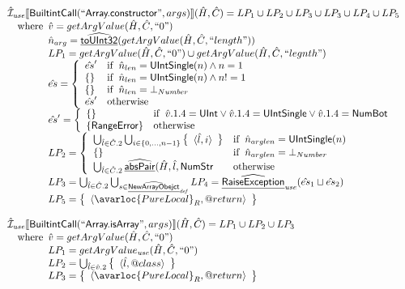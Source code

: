\[
\begin{array}{l}

\aI_{\it use}\lbr \SF{BuiltintCall}(``\SF{Array.constructor}",args)\rbr(\hat{H},\hat{C}) = LP_1 \cup LP_2 \cup LP_3 \cup LP_3 \cup LP_4 \cup LP_5\\
\quad\wherec{
  \hat{v} = getArgValue(\hat{H},\hat{C}, ``0")\\
  \hat{n}_{arg} = \ahf{toUInt32}(getArgValue(\hat{H},\hat{C}, ``length"))\\
  LP_1 = getArgValue(\hat{H},\hat{C}, ``0") \cup  getArgValue(\hat{H},\hat{C}, ``legnth")\\
  \hat{es} = \left\{\begin{array}{ll}
      \hat{es}' & \ifc{\hat{n}_{len} = \SF{UIntSingle}(n) \land n = 1}\\
      \set{} & \ifc{\hat{n}_{len} = \SF{UIntSingle}(n) \land n != 1}\\
      \set{} & \ifc{\hat{n}_{len} = \bot_{Number}}\\
      \hat{es}' & \owc
    \end{array}\right.\\  
  \hat{es}' = \left\{\begin{array}{ll}
      \set{}
      & \ifc{\hat{v}.1.4 = \SF{UInt} \lor \hat{v}.1.4 = \SF{UIntSingle} \lor \hat{v}.1.4 = \SF{NumBot} }\\
      \{ \SF{RangeError} \} & \owc
    \end{array}\right.\\
  LP_2 = \left\{\begin{array}{ll}
      \bigcup_{\hat{l} \in \hat{C}.2} \bigcup_{i \in \{0, ..., n-1\}} \set{\langle \hat{l}, i\rangle}
      & \ifc{\hat{n}_{arglen} = \SF{UIntSingle}(n)}\\
      \set{} & \ifc{\hat{n}_{arglen} = \bot_{Number}}\\
      \bigcup_{\hat{l} \in \hat{C}.2} \ahf{absPair}(\hat{H}, \hat{l}, \SF{NumStr} & \owc
    \end{array}\right.\\  
  LP_3 = \bigcup_{\hat{l} \in \hat{C}.2}\bigcup_{s \in \ahf{NewArrayObejct}_{\it def}}
  LP_4 = \ahf{RaiseException}_{\it use}(\hat{es}_1 \sqcup \hat{es}_2)\\
  LP_5 = \set{\langle\avarloc{PureLocal}_R,\varprop{return}\rangle}\\
  }\\
\\



\aI_{\it use}\lbr \SF{BuiltintCall}(``\SF{Array.isArray}",args)\rbr(\hat{H},\hat{C}) = LP_1 \cup LP_2 \cup LP_3\\
\quad\wherec{
  \hat{v} = getArgValue(\hat{H}, \hat{C}, ``0")\\
  LP_1 = getArgValue_{\it use}(\hat{H}, \hat{C}, ``0")\\
  LP_2 = \bigcup_{\hat{l} \in \hat{v}.2} \set{\langle \hat{l}, \varprop{class}\rangle}\\
  LP_3 = \set{\langle\avarloc{PureLocal}_R,\varprop{return}\rangle}\\
  }\\
\\


\end{array}\]
